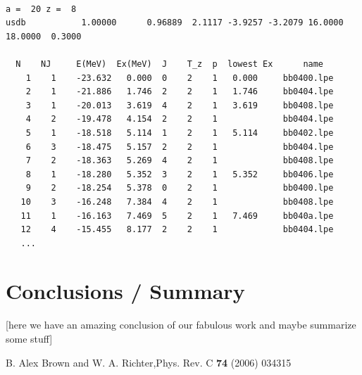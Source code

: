 \documentclass[twoside]{article}
\begin{document}
\begin{lstlisting}[label=nushellx, caption= \texttt{o\_20b.lpt} output from NushellX.]

a =  20 z =  8
usdb           1.00000      0.96889  2.1117 -3.9257 -3.2079 16.0000 18.0000  0.3000

  N    NJ     E(MeV)  Ex(MeV)  J    T_z  p  lowest Ex      name
    1    1    -23.632   0.000  0    2    1   0.000     bb0400.lpe          
    2    1    -21.886   1.746  2    2    1   1.746     bb0404.lpe          
    3    1    -20.013   3.619  4    2    1   3.619     bb0408.lpe          
    4    2    -19.478   4.154  2    2    1             bb0404.lpe          
    5    1    -18.518   5.114  1    2    1   5.114     bb0402.lpe          
    6    3    -18.475   5.157  2    2    1             bb0404.lpe          
    7    2    -18.363   5.269  4    2    1             bb0408.lpe          
    8    1    -18.280   5.352  3    2    1   5.352     bb0406.lpe          
    9    2    -18.254   5.378  0    2    1             bb0400.lpe          
   10    3    -16.248   7.384  4    2    1             bb0408.lpe          
   11    1    -16.163   7.469  5    2    1   7.469     bb040a.lpe          
   12    4    -15.455   8.177  2    2    1             bb0404.lpe
   ...
\end{lstlisting}




\section{Conclusions / Summary}

[here we have an amazing conclusion of our fabulous work and maybe summarize some stuff]



\begin{thebibliography}{99} %
%

\bibitem[Github of the TALENT School][ MHJ and Alex Brown
\newblock {\em https://github.com/NuclearTalent/NuclearStructure}
\bibitem[usdb 2006]{Brown 2006} B. Alex Brown and W. A. Richter,Phys. Rev. C \textbf{74} (2006) 034315

\end{thebibliography}
\end{document}
